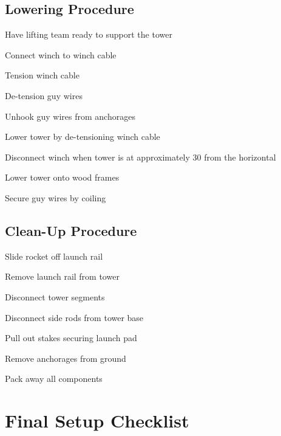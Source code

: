 \subsection{Lowering Procedure}
\begin{checklist}
\item Have lifting team ready to support the tower
\item Connect winch to winch cable
\item Tension winch cable
\item De-tension guy wires
\item Unhook guy wires from anchorages
\item Lower tower by de-tensioning winch cable
\item Disconnect winch when tower is at approximately 30\degree{} from the horizontal
\item Lower tower onto wood frames
\item Secure guy wires by coiling
\end{checklist}

\subsection{Clean-Up Procedure}
\begin{checklist}
\item Slide rocket off launch rail
\item Remove launch rail from tower
\item Disconnect tower segments
\item Disconnect side rods from tower base
\item Pull out stakes securing launch pad
\item Remove anchorages from ground
\item Pack away all components
\end{checklist}

\section {Final Setup Checklist}
